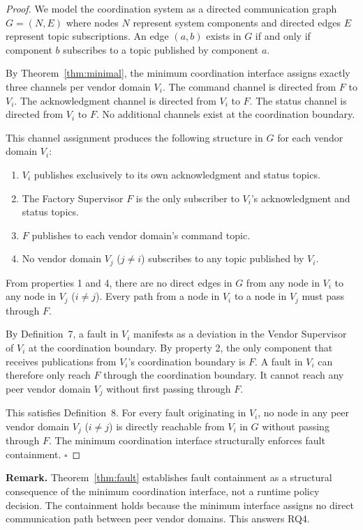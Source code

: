 \documentclass[a4paper,fleqn]{cas-dc}
\begin{document}
\begin{proof}
We model the coordination system as a directed communication graph $G = (N, E)$ where nodes $N$ represent system components and directed edges $E$ represent topic subscriptions. An edge $(a, b)$ exists in $G$ if and only if component $b$ subscribes to a topic published by component $a$.

By Theorem~\ref{thm:minimal}, the minimum coordination interface assigns exactly three channels per vendor domain $V_i$. The command channel is directed from $F$ to $V_i$. The acknowledgment channel is directed from $V_i$ to $F$. The status channel is directed from $V_i$ to $F$. No additional channels exist at the coordination boundary.

This channel assignment produces the following structure in $G$ for each vendor domain $V_i$:
\begin{enumerate}
    \item $V_i$ publishes exclusively to its own acknowledgment and status topics.
    \item The Factory Supervisor $F$ is the only subscriber to $V_i$'s acknowledgment and status topics.
    \item $F$ publishes to each vendor domain's command topic.
    \item No vendor domain $V_j$ ($j \neq i$) subscribes to any topic published by $V_i$.
\end{enumerate}

From properties 1 and 4, there are no direct edges in $G$ from any node in $V_i$ to any node in $V_j$ ($i \neq j$). Every path from a node in $V_i$ to a node in $V_j$ must pass through $F$.

By Definition~7, a fault in $V_i$ manifests as a deviation in the Vendor Supervisor of $V_i$ at the coordination boundary. By property 2, the only component that receives publications from $V_i$'s coordination boundary is $F$. A fault in $V_i$ can therefore only reach $F$ through the coordination boundary. It cannot reach any peer vendor domain $V_j$ without first passing through $F$.

This satisfies Definition~8. For every fault originating in $V_i$, no node in any peer vendor domain $V_j$ ($i \neq j$) is directly reachable from $V_i$ in $G$ without passing through $F$. The minimum coordination interface structurally enforces fault containment. \hfill$\square$
\end{proof}

\noindent\textbf{Remark.} Theorem~\ref{thm:fault} establishes fault containment as a structural consequence of the minimum coordination interface, not a runtime policy decision. The containment holds because the minimum interface assigns no direct communication path between peer vendor domains. This answers RQ4.
\end{document}
